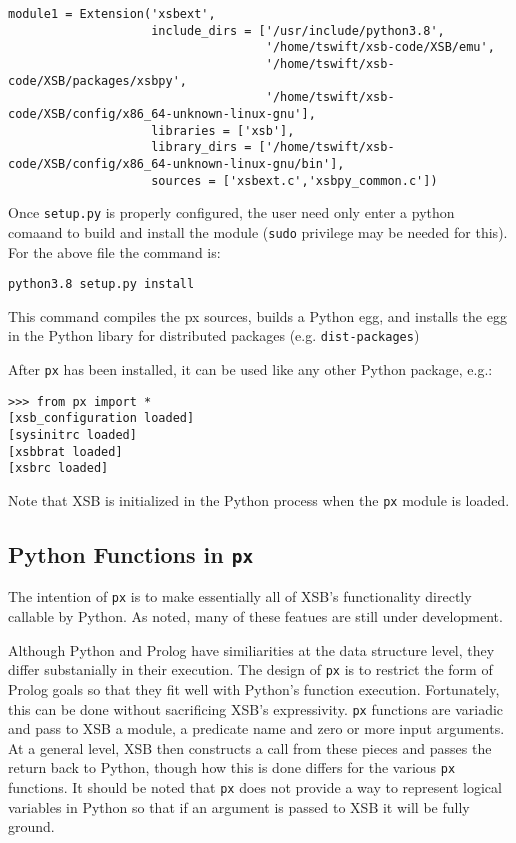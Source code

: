 \begin{footnotesize}
  \begin{verbatim}
module1 = Extension('xsbext',
                    include_dirs = ['/usr/include/python3.8',
                                    '/home/tswift/xsb-code/XSB/emu',
                                    '/home/tswift/xsb-code/XSB/packages/xsbpy',
                                    '/home/tswift/xsb-code/XSB/config/x86_64-unknown-linux-gnu'],
                    libraries = ['xsb'],
                    library_dirs = ['/home/tswift/xsb-code/XSB/config/x86_64-unknown-linux-gnu/bin'],
                    sources = ['xsbext.c','xsbpy_common.c'])
  \end{verbatim}
\end{footnotesize}

Once {\tt setup.py} is properly configured, the user need only enter a
python comaand to build and install the module ({\tt sudo} privilege
may be needed for this).  For the above file the command is:

\begin{verbatim}
python3.8 setup.py install
\end{verbatim}
\noindent
This command compiles the px sources, builds a Python egg, and
installs the egg in the Python libary for distributed packages
(e.g. {\tt dist-packages})

After {\tt px} has been installed, it can be used like any other Python
package, e.g.:

\begin{verbatim}
>>> from px import *
[xsb_configuration loaded]
[sysinitrc loaded]
[xsbbrat loaded]
[xsbrc loaded]
\end{verbatim}
\noindent
Note that XSB is initialized in the Python process when the {\tt px}
module is loaded.

\subsection{Python Functions in {\tt px}}

The intention of {\tt px} is to make essentially all of XSB's
functionality directly callable by Python.  As noted, many of these
featues are still under development.

Although Python and Prolog have similiarities at the data structure
level, they differ substanially in their execution.  The design of
{\tt px} is to restrict the form of Prolog goals so that they fit well
with Python's function execution.  Fortunately, this can be done
without sacrificing XSB's expressivity.  {\tt px} functions are
variadic and pass to XSB a module, a predicate name and zero or more
input arguments.  At a general level, XSB then constructs a call from
these pieces and passes the return back to Python, though how this is
done differs for the various {\tt px} functions.  It should be noted
that {\tt px} does not provide a way to represent logical variables in
Python so that if an argument is passed to XSB it will be fully
ground.


